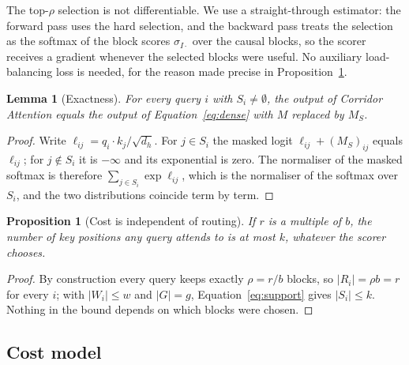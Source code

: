 \documentclass[11pt]{article}
\newtheorem{lemma}{Lemma}
\newtheorem{proposition}{Proposition}
\begin{document}
The top-$\rho$ selection is not differentiable. We use a straight-through
estimator: the forward pass uses the hard selection, and the backward pass
treats the selection as the softmax of the block scores $\sigma_{I\cdot}$
over the causal blocks, so the scorer receives a gradient whenever the
selected blocks were useful. No auxiliary load-balancing loss is needed, for
the reason made precise in Proposition~\ref{prop:cost}.

\begin{lemma}[Exactness]\label{lem:exact}
For every query $i$ with $S_i \ne \emptyset$, the output of Corridor
Attention equals the output of Equation~\eqref{eq:dense} with $M$ replaced
by $M_S$.
\end{lemma}
\begin{proof}
Write $\ell_{ij} = q_i \cdot k_j / \sqrt{d_h}$. For $j \in S_i$ the masked
logit $\ell_{ij} + (M_S)_{ij}$ equals $\ell_{ij}$; for $j \notin S_i$ it is
$-\infty$ and its exponential is zero. The normaliser of the masked softmax
is therefore $\sum_{j \in S_i} \exp \ell_{ij}$, which is the normaliser of
the softmax over $S_i$, and the two distributions coincide term by term.
\end{proof}

\begin{proposition}[Cost is independent of routing]\label{prop:cost}
If $r$ is a multiple of $b$, the number of key positions any query attends
to is at most $k$, whatever the scorer chooses.
\end{proposition}
\begin{proof}
By construction every query keeps exactly $\rho = r/b$ blocks, so
$|R_i| = \rho b = r$ for every $i$; with $|W_i| \le w$ and $|G| = g$,
Equation~\eqref{eq:support} gives $|S_i| \le k$. Nothing in the bound
depends on which blocks were chosen.
\end{proof}

\subsection{Cost model}\label{sec:cost}
\end{document}
